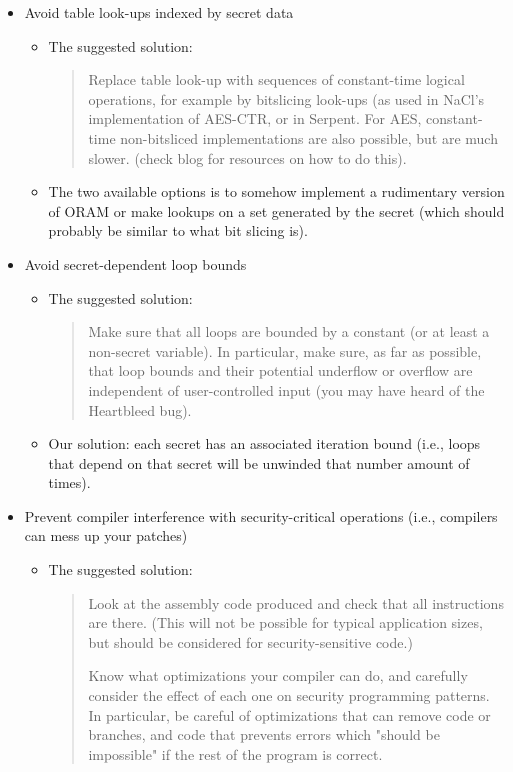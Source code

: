 \begin{itemize}
\begin{itemize}
\end{itemize}
\item Avoid table look-ups indexed by secret data
\begin{itemize}
\item The suggested solution: 
\begin{quote}
Replace table look-up with sequences of constant-time logical operations, for example by bitslicing look-ups (as used in NaCl's implementation of AES-CTR, or in Serpent. For AES, constant-time non-bitsliced implementations are also possible, but are much slower. (check blog for resources on how to do this).
\end{quote}
\item The two available options is to somehow implement a rudimentary version of ORAM or make lookups on a set generated by the secret (which should probably be similar to what bit slicing is).
\end{itemize}
\item Avoid secret-dependent loop bounds
\begin{itemize}
\item The suggested solution: 
\begin{quote}
Make sure that all loops are bounded by a constant (or at least a non-secret variable). In particular, make sure, as far as possible, that loop bounds and their potential underflow or overflow are independent of user-controlled input (you may have heard of the Heartbleed bug).
\end{quote}
\item Our solution: each secret has an associated iteration bound (i.e., loops that depend on that secret will be unwinded that number amount of times).
\end{itemize}
\item Prevent compiler interference with security-critical operations (i.e., compilers can mess up your patches)
\begin{itemize}

\item The suggested solution: 
\begin{quote}
Look at the assembly code produced and check that all instructions are there. (This will not be possible for typical application sizes, but should be considered for security-sensitive code.)

Know what optimizations your compiler can do, and carefully consider the effect of each one on security programming patterns. In particular, be careful of optimizations that can remove code or branches, and code that prevents errors which "should be impossible" if the rest of the program is correct.


\end{quote}
\end{itemize}
\end{itemize}
